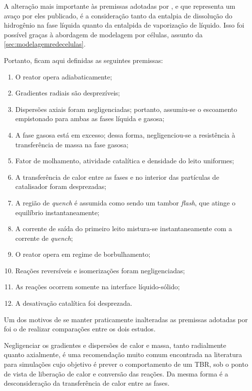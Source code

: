 A alteração mais importante às premissas adotadas por , e
que representa um avaço por eles publicado, é a consideração tanto da entalpia
de dissolução do hidrogênio na fase líquida quanto da entalpida de vaporização
de líquido. Isso foi possível graças à abordagem de modelagem por células,
assunto da \autoref{sec:modelagemredecelulas}.

Portanto, ficam aqui definidas as seguintes premissas:

\begin{enumerate}
  \item O reator opera adiabaticamente;
  \item Gradientes radiais são desprezíveis;
  \item Dispersões axiais foram negligenciadas; portanto, assumiu-se o
  escoamento empistonado para ambas as fases líquida e gasosa;
  \item A fase gasosa está em excesso; dessa forma, negligenciou-se a
  resistência à transferência de massa na fase gasosa;
  \item Fator de molhamento, atividade catalítica e densidade do leito
  uniformes;
  \item A transferência de calor entre as fases e no interior das partículas de
  catalisador foram desprezadas;
  \item A região de \emph{quench} é assumida como sendo um tambor \emph{flash},
  que atinge o equilíbrio instantaneamente;
  \item A corrente de saída do primeiro leito mistura-se instantaneamente com a
  corrente de \emph{quench};
  \item O reator opera em regime de borbulhamento;
  \item Reações reversíveis e isomerizações foram negligenciadas;
  \item As reações ocorrem somente na interface líquido-sólido;
  \item A desativação catalítica foi desprezada.
\end{enumerate}

Um dos motivos de se manter praticamente inalteradas as premissas adotadas por
 foi o de realizar comparações entre os dois estudos.

Negligenciar os gradientes e dispersões de calor e massa, tanto radialmente
quanto axialmente, é uma recomendação muito comum encontrada na literatura
\cite{Ancheyta2011, Ranade2011, Froment2011} para simulações cujo objetivo é
prever o comportamento de um TBR, sob o ponto de vista de liberação de calor e
conversão das reações. Da mesma forma é a desconsideração da transferência de
calor entre as fases.

